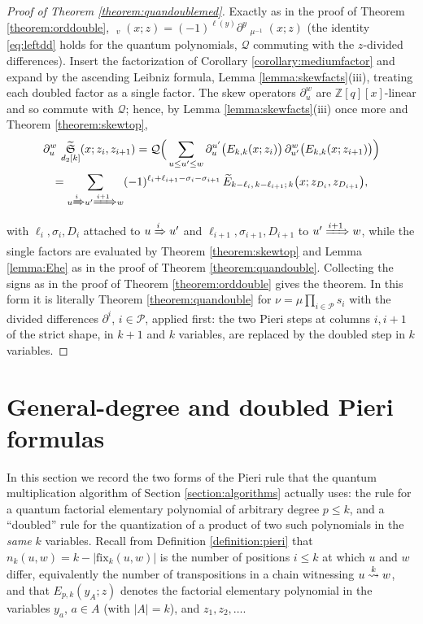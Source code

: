 \documentclass{amsart}
\theoremstyle{definition}
\theoremstyle{remark}
\numberwithin{equation}{section}
\DeclareMathOperator{\qsch}{\widetilde{\mathfrak{S}}}
\newcommand{\xrightsquigarrow}[2][]{%
	\mathrel{\mathop{\rightsquigarrow}\limits^{\scriptstyle #2}%
	\ifx\hfuzz#1\hfuzz\else_{\scriptstyle #1}\fi}%
}
\newcommand{\tom}[1]{\ensuremath{\xrightsquigarrow{#1}}}
\newcommand{\fx}{\mathrm{fix}}
\newcommand{\qelem}{\widetilde{E}}
\begin{document}
\begin{proof}[Proof of Theorem \ref{theorem:quandoublemed}]
Exactly as in the proof of Theorem \ref{theorem:orddouble}, $\qsch_v(x;z)=(-1)^{\ell(y)}\partial^y\qsch_{\mu^{-1}}(x;z)$ (the identity \eqref{eq:leftdd} holds for the quantum polynomials, $\mathcal Q$ commuting with the $z$-divided differences). Insert the factorization of Corollary \ref{corollary:mediumfactor} and expand by the ascending Leibniz formula, Lemma \ref{lemma:skewfacts}(iii), treating each doubled factor as a single factor. The skew operators $\partial^w_u$ are $\mathbb Z[q][x]$-linear and so commute with $\mathcal Q$; hence, by Lemma \ref{lemma:skewfacts}(iii) once more and Theorem \ref{theorem:skewtop},
\begin{multline*}
\partial^{w}_{u}\,\qsch_{d_2[k]}(x;z_i,z_{i+1})=\mathcal Q\Big(\sum_{u\leq u'\leq w}\partial^{u'}_u\big(E_{k,k}(x;z_i)\big)\,\partial^{w}_{u'}\big(E_{k,k}(x;z_{i+1})\big)\Big)\\
=\sum_{u\Tom iu'\Tom{i+1}w}(-1)^{\ell_i+\ell_{i+1}-\sigma_i-\sigma_{i+1}}\,\qelem_{k-\ell_i,\,k-\ell_{i+1};\,k}\big(x;z_{D_i},z_{D_{i+1}}\big),
\end{multline*}
with $\ell_i,\sigma_i,D_i$ attached to $u\xRightarrow{i}u'$ and $\ell_{i+1},\sigma_{i+1},D_{i+1}$ to $u'\xRightarrow{i+1}w$, while the single factors are evaluated by Theorem \ref{theorem:skewtop} and Lemma \ref{lemma:Ehe} as in the proof of Theorem \ref{theorem:quandouble}. Collecting the signs as in the proof of Theorem \ref{theorem:orddouble} gives the theorem. In this form it is literally Theorem \ref{theorem:quandouble} for $\nu=\mu\prod_{i\in\mathcal P}s_i$ with the divided differences $\partial^i$, $i\in\mathcal P$, applied first: the two Pieri steps at columns $i,i+1$ of the strict shape, in $k+1$ and $k$ variables, are replaced by the doubled step in $k$ variables.
\end{proof}

\section{General-degree and doubled Pieri formulas} \label{section:additional}

In this section we record the two forms of the Pieri rule that the quantum multiplication algorithm of Section \ref{section:algorithms} actually uses: the rule for a quantum factorial elementary polynomial of arbitrary degree $p\leq k$, and a ``doubled'' rule for the quantization of a product of two such polynomials in the \emph{same} $k$ variables. Recall from Definition \ref{definition:pieri} that $n_k(u,w)=k-|\fx_k(u,w)|$ is the number of positions $i\leq k$ at which $u$ and $w$ differ, equivalently the number of transpositions in a chain witnessing $u\tom{k}w$, and that $E_{p,k}(y_A;z)$ denotes the factorial elementary polynomial in the variables $y_a$, $a\in A$ (with $|A|=k$), and $z_1,z_2,\ldots$.
\end{document}
